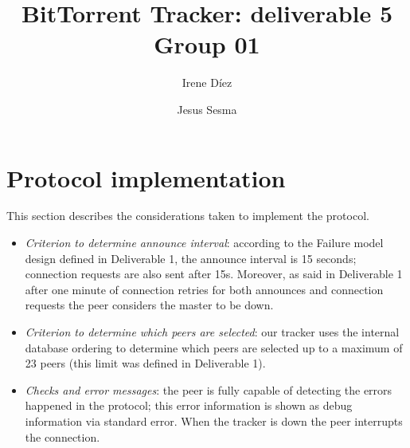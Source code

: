 \documentclass[twoside,a4paper,10pt]{article}
\title{BitTorrent Tracker: deliverable 5\\
  Group 01}
\author{Irene Díez \and Jesus Sesma}
\begin{document}
\date{}
\maketitle

\section{Protocol implementation}\label{sec:pa-hierarchy}

This section describes the considerations taken to implement the protocol.

\begin{itemize}
\item \emph{Criterion to determine announce interval}: according to the
  Failure model design defined in Deliverable 1, the announce interval is
  15 seconds; connection requests are also sent after 15s. Moreover, as said
  in Deliverable 1 after one minute of connection retries for both
  announces and connection requests the peer considers the master to be down.
\item \emph{Criterion to determine which peers are selected}: our tracker
  uses the internal database ordering to determine which peers are selected
  up to a maximum of 23 peers (this limit was defined in Deliverable 1).
\item \emph{Checks and error messages}: the peer is fully capable of detecting
  the errors happened in the protocol; this error information is shown as debug
  information via standard error.
  When the tracker is down the peer interrupts the connection.
\end{itemize}

%
%
\end{document}
